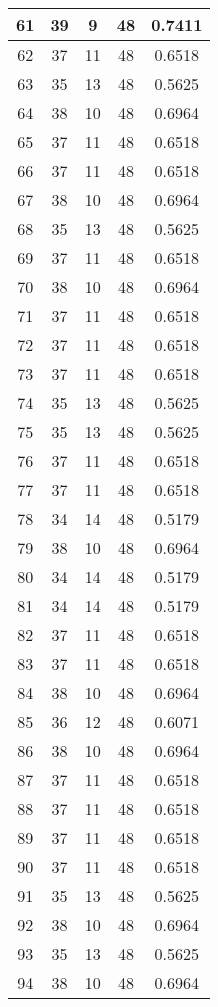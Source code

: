 \documentclass[letterpaper, 12pt]{article}
\begin{document}
\begin{longtable}{|c|c|c|c|c|}
\hline
61 & 39 & 9 & 48 & 0.7411 \\
\hline
62 & 37 & 11 & 48 & 0.6518 \\
\hline
63 & 35 & 13 & 48 & 0.5625 \\
\hline
64 & 38 & 10 & 48 & 0.6964 \\
\hline
65 & 37 & 11 & 48 & 0.6518 \\
\hline
66 & 37 & 11 & 48 & 0.6518 \\
\hline
67 & 38 & 10 & 48 & 0.6964 \\
\hline
68 & 35 & 13 & 48 & 0.5625 \\
\hline
69 & 37 & 11 & 48 & 0.6518 \\
\hline
70 & 38 & 10 & 48 & 0.6964 \\
\hline
71 & 37 & 11 & 48 & 0.6518 \\
\hline
72 & 37 & 11 & 48 & 0.6518 \\
\hline
73 & 37 & 11 & 48 & 0.6518 \\
\hline
74 & 35 & 13 & 48 & 0.5625 \\
\hline
75 & 35 & 13 & 48 & 0.5625 \\
\hline
76 & 37 & 11 & 48 & 0.6518 \\
\hline
77 & 37 & 11 & 48 & 0.6518 \\
\hline
78 & 34 & 14 & 48 & 0.5179 \\
\hline
79 & 38 & 10 & 48 & 0.6964 \\
\hline
80 & 34 & 14 & 48 & 0.5179 \\
\hline
81 & 34 & 14 & 48 & 0.5179 \\
\hline
82 & 37 & 11 & 48 & 0.6518 \\
\hline
83 & 37 & 11 & 48 & 0.6518 \\
\hline
84 & 38 & 10 & 48 & 0.6964 \\
\hline
85 & 36 & 12 & 48 & 0.6071 \\
\hline
86 & 38 & 10 & 48 & 0.6964 \\
\hline
87 & 37 & 11 & 48 & 0.6518 \\
\hline
88 & 37 & 11 & 48 & 0.6518 \\
\hline
89 & 37 & 11 & 48 & 0.6518 \\
\hline
90 & 37 & 11 & 48 & 0.6518 \\
\hline
91 & 35 & 13 & 48 & 0.5625 \\
\hline
92 & 38 & 10 & 48 & 0.6964 \\
\hline
93 & 35 & 13 & 48 & 0.5625 \\
\hline
94 & 38 & 10 & 48 & 0.6964 \\

\end{longtable}
\end{document}
